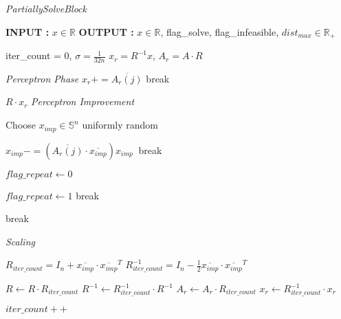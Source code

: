 \documentclass[a4paper,twoside,10pt]{report}
\begin{document}
	
	\begin{algorithm}
	\caption{\textit{PartiallySolveBlock}}
	\label{algPartialSolve}
	\begin{center}
	\begin{algorithmic}
	
	\STATE \textbf{INPUT :} \(x\in \mathbb{R}\) 	
	\STATE \textbf{OUTPUT :} \(x\in \mathbb{R}\), flag{\_}solve, flag{\_}infeasible, \(dist_{max}\in\mathbb{R}_+\)
	
	\STATE iter{\_}count = 0, \(\sigma = \frac{1}{32n}\)
	\STATE \(x_r = R^{-1} x\), \(A_r = A\cdot R\)
	
	\STATE
	\STATE \textit{Perceptron Phase}	
				\STATE \(x_r += \overline{A_r(j)}\)
				\STATE break
			\ENDIF
		\ENDFOR			
	\ENDFOR
	
		\RETURN \(R\cdot x_r\)
	\ENDIF
	\STATE
	\STATE \textit{Perceptron Improvement}
	
	\LOOP	
	\STATE Choose \(x_{imp}\in\mathbb{S}^n\) uniformly random
	
				\STATE \(x_{imp} -= (\overline{A_r(j)}\cdot \overline{x_{imp}})x_{imp} \ \)
				\STATE break
			\ENDIF
		\ENDFOR
	\ENDFOR
	
	\STATE \(flag{\_}repeat \gets 0\)
	
				\STATE \(flag{\_}repeat \gets 1\)
				\STATE break
			\ENDIF		
	\ENDFOR
	
		\STATE break
	\ENDIF	
		
	\ENDLOOP
	
	\STATE
	\STATE \textit{Scaling}	
	
	\STATE \(R_{iter{\_}count} = I_n + \overline{x_{imp}} \cdot \overline{x_{imp}}^T \)
	\STATE \(R^{-1}_{iter{\_}count} = I_n - \frac{1}{2} \overline{x_{imp}} \cdot \overline{x_{imp}}^T \)
	
	\STATE \(R \gets R \cdot R_{iter{\_}count}\)
	\STATE \(R^{-1} \gets R^{-1}_{iter{\_}count}\cdot R^{-1}\)
	\STATE \(A_r \gets A_r \cdot R_{iter{\_}count}\)
	\STATE \(x_r \gets R^{-1}_{iter{\_}count} \cdot x_r\)
	
	
	\STATE \(iter{\_}count++\)
	
	\ENDWHILE
	\end{algorithmic}
	\end{center}
	\end{algorithm}		
	
\end{document}
